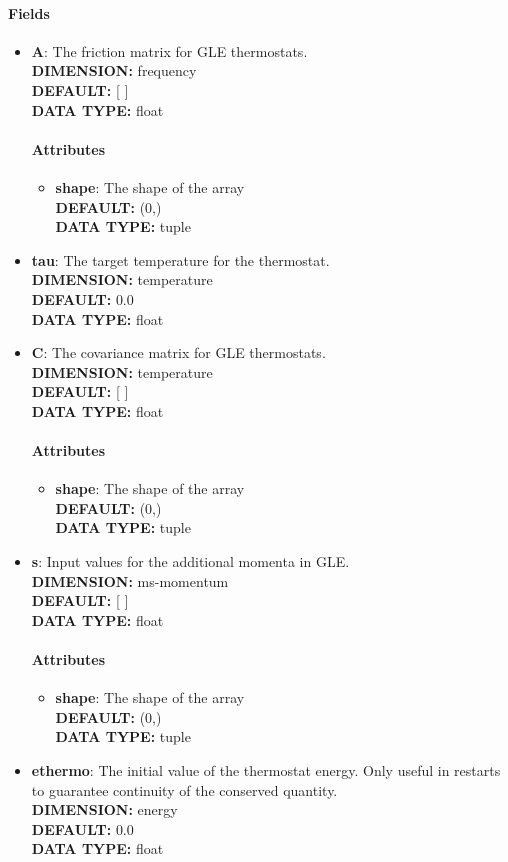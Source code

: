 \paragraph{Fields}
 \begin{itemize}
\item {\bf A}:
 The friction matrix for GLE thermostats.
{\\ \bf DIMENSION: }frequency
{\\ \bf DEFAULT: }[ ]
{\\ \bf DATA TYPE: }float
\paragraph{Attributes}
 \begin{itemize}
\item {\bf shape}:
 The shape of the array
{\\ \bf DEFAULT: }(0,)
{\\ \bf DATA TYPE: }tuple
\end{itemize}
 
\item {\bf tau}:
 The target temperature for the thermostat.
{\\ \bf DIMENSION: }temperature
{\\ \bf DEFAULT: }0.0
{\\ \bf DATA TYPE: }float
\item {\bf C}:
 The covariance matrix for GLE thermostats.
{\\ \bf DIMENSION: }temperature
{\\ \bf DEFAULT: }[ ]
{\\ \bf DATA TYPE: }float
\paragraph{Attributes}
 \begin{itemize}
\item {\bf shape}:
 The shape of the array
{\\ \bf DEFAULT: }(0,)
{\\ \bf DATA TYPE: }tuple
\end{itemize}
 
\item {\bf s}:
 Input values for the additional momenta in GLE.
{\\ \bf DIMENSION: }ms-momentum
{\\ \bf DEFAULT: }[ ]
{\\ \bf DATA TYPE: }float
\paragraph{Attributes}
 \begin{itemize}
\item {\bf shape}:
 The shape of the array
{\\ \bf DEFAULT: }(0,)
{\\ \bf DATA TYPE: }tuple
\end{itemize}
 
\item {\bf ethermo}:
 The initial value of the thermostat energy. Only useful in restarts to guarantee continuity of the conserved quantity. 
{\\ \bf DIMENSION: }energy
{\\ \bf DEFAULT: }0.0
{\\ \bf DATA TYPE: }float
\end{itemize}
 
